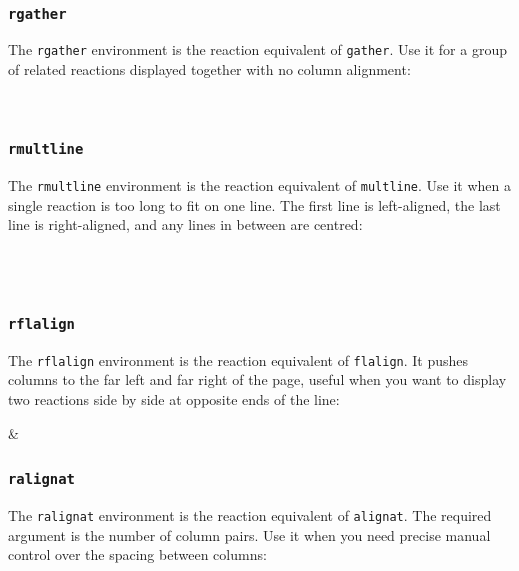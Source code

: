 \begin{ralign}
	 \notag \\
	\label{rxn:mechanism}
\end{ralign}

\subsubsection{\texttt{rgather}}
The \texttt{rgather} environment is the reaction equivalent of \texttt{gather}. Use it for a group of related reactions displayed together with no column alignment:

\begin{rgather}
	 \notag \\
	\label{rxn:gather}
\end{rgather}

\subsubsection{\texttt{rmultline}}
The \texttt{rmultline} environment is the reaction equivalent of \texttt{multline}. Use it when a single reaction is too long to fit on one line. The first line is left-aligned, the last line is right-aligned, and any lines in between are centred:

\begin{rmultline}
	 \\
	\ce{->} \\
	\label{rxn:fission}
\end{rmultline}

\subsubsection{\texttt{rflalign}}
The \texttt{rflalign} environment is the reaction equivalent of \texttt{flalign}. It pushes columns to the far left and far right of the page, useful when you want to display two reactions side by side at opposite ends of the line:

\begin{rflalign}
	 &  \quad %
	\label{rxn:flalign}
\end{rflalign}

\subsubsection{\texttt{ralignat}}
The \texttt{ralignat} environment is the reaction equivalent of \texttt{alignat}. The required argument is the number of column pairs. Use it when you need precise manual control over the spacing between columns:

